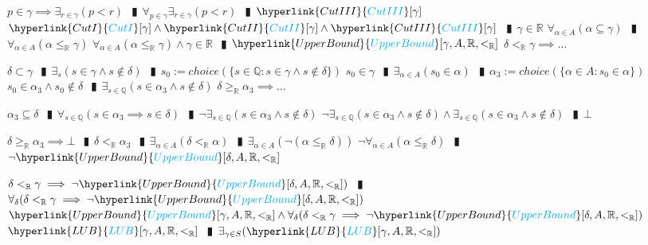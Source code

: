 \documentclass{book}
\newcommand{\rf}[1]{\hyperlink{#1}{\textcolor{cyan}{#1}}}
\newcommand{\abr}{:=}
\newcommand{\pipe}{$\phantom{(}\vrectangleblack\phantom{)}$}
\newcommand{\pr}[1]{\left(#1\right)}
\begin{document}
\begin{enumerate}
\begin{enumerate}
\begin{enumerate}
    \end{enumerate}
    \lit $p \in \gamma \implies \exists_{r \in \gamma}(p < r)$ \pipe $\forall_{p \in \gamma} \exists_{r \in \gamma}(p < r)$ \pipe $\rf{CutIII}[\gamma]$
    \lit $\rf{CutI}[\gamma] \land \rf{CutII}[\gamma] \land \rf{CutIII}[\gamma]$ \pipe $\gamma \in \mathbb{R}$
    \lit $\forall_{\alpha \in A}(\alpha \subseteq \gamma)$ \pipe $\forall_{\alpha \in A}(\alpha \leq_{\mathbb{R}} \gamma)$
    \lit $\forall_{\alpha \in A}(\alpha \leq_{\mathbb{R}} \gamma) \land \gamma \in \mathbb{R}$ \pipe $\rf{UpperBound}[\gamma, A, \mathbb{R}, <_{\mathbb{R}}]$
    \lit $\delta <_{\mathbb{R}} \gamma \implies \ldots$
    \begin{enumerate}
      \lit $\delta \subset \gamma$ \pipe $\exists_{s}(s \in \gamma \land s \notin \delta)$ \pipe $s_0 \abr choice(\{s \in \mathbb{Q} : s \in \gamma \land s \notin \delta\})$
      \lit $s_0 \in \gamma$ \pipe $\exists_{\alpha \in A}(s_0 \in \alpha)$ \pipe $\alpha_3 \abr choice(\{\alpha \in A : s_0 \in \alpha\})$
      \lit $s_0 \in \alpha_3 \land s_0 \notin \delta$ \pipe $\exists_{s \in \mathbb{Q}}(s \in \alpha_3 \land s \notin \delta)$
      \lit $\delta \geq_{\mathbb{R}} \alpha_3 \implies \ldots$
      \begin{enumerate}
        \lit $\alpha_3 \subseteq \delta$ \pipe $\forall_{s \in \mathbb{Q}}(s \in \alpha_3 \implies s \in \delta)$ \pipe $\lnot \exists_{s \in \mathbb{Q}}(s \in \alpha_3 \land s \notin \delta)$
        \lit $\lnot \exists_{s \in \mathbb{Q}}(s \in \alpha_3 \land s \notin \delta) \land \exists_{s \in \mathbb{Q}}(s \in \alpha_3 \land s \notin \delta)$ \pipe $\bot$
      \end{enumerate}
      \lit $\delta \geq_{\mathbb{R}} \alpha_3 \implies \bot$ \pipe $\delta <_{\mathbb{R}} \alpha_3$ \pipe $\exists_{\alpha \in A}(\delta <_{\mathbb{R}} \alpha)$ \pipe $\exists_{\alpha \in A}\pr{\lnot(\alpha \leq_{\mathbb{R}} \delta)}$
      \lit $\lnot \forall_{\alpha \in A}(\alpha \leq_{\mathbb{R}} \delta)$ \pipe $\lnot \rf{UpperBound}[\delta, A, \mathbb{R}, <_{\mathbb{R}}]$
    \end{enumerate}
    \lit $\delta <_{\mathbb{R}} \gamma \implies \lnot \rf{UpperBound}[\delta, A, \mathbb{R}, <_{\mathbb{R}}])$ \pipe $\forall_{\delta}(\delta <_{\mathbb{R}} \gamma \implies \lnot \rf{UpperBound}[\delta, A, \mathbb{R}, <_{\mathbb{R}}])$
    \lit $\rf{UpperBound}[\gamma, A, \mathbb{R}, <_{\mathbb{R}}] \land \forall_{\delta}(\delta <_{\mathbb{R}} \gamma \implies \lnot \rf{UpperBound}[\delta, A, \mathbb{R}, <_{\mathbb{R}}])$
    \lit $\rf{LUB}[\gamma, A, \mathbb{R}, <_{\mathbb{R}}]$ \pipe $\exists_{\gamma \in S}(\rf{LUB}[\gamma, A, \mathbb{R}, <_{\mathbb{R}}])$

\end{enumerate}
\end{enumerate}
\end{document}

